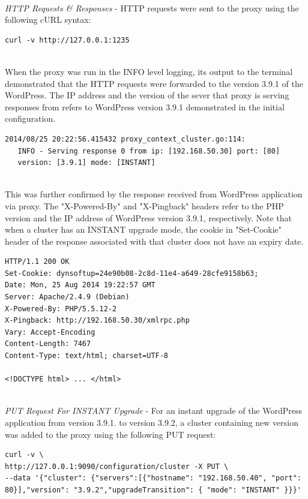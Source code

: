 \documentclass[a4paper,11pt,twoside]{report}
\begin{document}
\noindent \\
\textit{HTTP Requests \& Responses} - HTTP requests were sent to the proxy using the following cURL syntax:\smallskip
\begin{lstlisting}[language=terminal] 
curl -v http://127.0.0.1:1235 
\end{lstlisting} 

\noindent\\
When the proxy was run in the INFO level logging, its output to the terminal demonstrated that the HTTP requests were forwarded to the version 3.9.1 of the WordPress. The IP address and the version of the sever that proxy is serving responses from refers to WordPress version 3.9.1 demonstrated in the initial configuration.\smallskip

\begin{lstlisting}[language=terminal] 
2014/08/25 20:22:56.415432 proxy_context_cluster.go:114:     
   INFO - Serving response 0 from ip: [192.168.50.30] port: [80] 
   version: [3.9.1] mode: [INSTANT]
\end{lstlisting} 

\noindent\\
This was further confirmed by the response received from WordPress application via proxy. The "X-Powered-By" and "X-Pingback" headers refer to the PHP version and the IP address of WordPress version 3.9.1, respectively. Note that when a cluster has an INSTANT upgrade mode, the cookie in "Set-Cookie" header of the response associated with that cluster does not have an expiry date. \smallskip  

\begin{lstlisting}[language=terminal] 
HTTP/1.1 200 OK
Set-Cookie: dynsoftup=24e90b08-2c8d-11e4-a649-28cfe9158b63;
Date: Mon, 25 Aug 2014 19:22:57 GMT
Server: Apache/2.4.9 (Debian)
X-Powered-By: PHP/5.5.12-2
X-Pingback: http://192.168.50.30/xmlrpc.php
Vary: Accept-Encoding
Content-Length: 7467
Content-Type: text/html; charset=UTF-8

<!DOCTYPE html> ... </html>
\end{lstlisting} 

\noindent\\
\textit{PUT Request For INSTANT Upgrade} - For an instant upgrade of the WordPress application from version 3.9.1. to version 3.9.2, a cluster containing new version was added to the proxy using the following PUT request: \smallskip 

\begin{lstlisting}[language=terminal] 
curl -v \
http://127.0.0.1:9090/configuration/cluster -X PUT \
--data '{"cluster": {"servers":[{"hostname": "192.168.50.40", "port": 80}],"version": "3.9.2","upgradeTransition": { "mode": "INSTANT" }}}'
\end{lstlisting}
\end{document}
